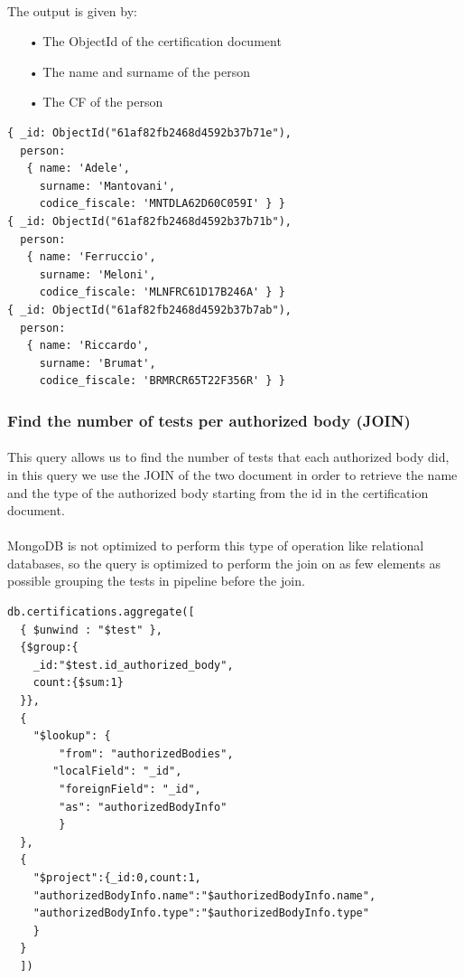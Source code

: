 \documentclass[a4paper,12pt]{article}
\begin{document}
\paragraph{} The output is given by: 
\begin{itemize}[noitemsep]
\item[•] The ObjectId of the certification document
\item[•] The name and surname of the person
\item[•] The CF of the person
\end{itemize}
\begin{tcolorbox}[colback=red!5!white,colframe=red!75!black,title=OUTPUT]
\begin{verbatim}
{ _id: ObjectId("61af82fb2468d4592b37b71e"),
  person: 
   { name: 'Adele',
     surname: 'Mantovani',
     codice_fiscale: 'MNTDLA62D60C059I' } }
{ _id: ObjectId("61af82fb2468d4592b37b71b"),
  person: 
   { name: 'Ferruccio',
     surname: 'Meloni',
     codice_fiscale: 'MLNFRC61D17B246A' } }
{ _id: ObjectId("61af82fb2468d4592b37b7ab"),
  person: 
   { name: 'Riccardo',
     surname: 'Brumat',
     codice_fiscale: 'BRMRCR65T22F356R' } }
\end{verbatim}
\end{tcolorbox}


\subsubsection{Find the number of tests per authorized body (JOIN) }
\paragraph{} This query allows us to find the number of tests that each authorized body did, in this query we use the JOIN of the two document in order to retrieve the name and the type of the authorized body starting from the id in the certification document. 
\paragraph{}MongoDB is not optimized to perform this type of operation like relational databases, so the query is optimized to perform the join on as few elements as possible grouping the tests in pipeline before the join.

\begin{tcolorbox}[colback=green!5!white,colframe=green!75!black,title=QUERY]
\begin{verbatim}
db.certifications.aggregate([
  { $unwind : "$test" },
  {$group:{
    _id:"$test.id_authorized_body",
    count:{$sum:1}
  }},
  {
    "$lookup": {
        "from": "authorizedBodies",
       "localField": "_id",
        "foreignField": "_id",
        "as": "authorizedBodyInfo"
        }
  },
  {
    "$project":{_id:0,count:1,
    "authorizedBodyInfo.name":"$authorizedBodyInfo.name",
    "authorizedBodyInfo.type":"$authorizedBodyInfo.type"
    }
  }
  ])
\end{verbatim}
\end{tcolorbox}
\end{document}
